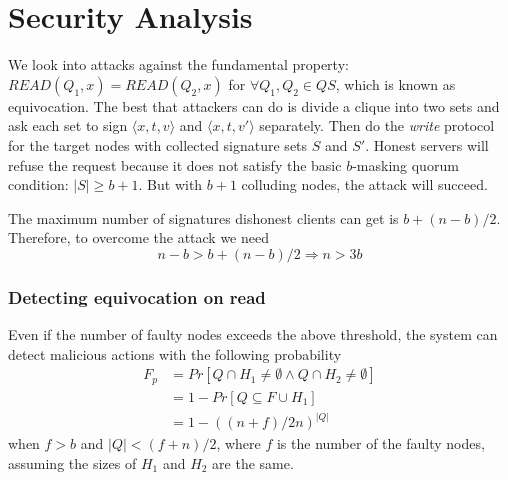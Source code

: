 \section{Security Analysis}
We look into attacks against the fundamental property:
$READ(Q_1,x) = READ(Q_2,x)$ for $\forall Q_1, Q_2 \in QS$, which is
known as equivocation.  The best that attackers can do is divide a
clique into two sets and ask each set to sign $\langle x,t,v \rangle$
and $\langle x,t,v' \rangle$ separately. Then do the {\em write}
protocol for the target nodes with collected signature sets $S$ and
$S'$. Honest servers will refuse the request because it does not
satisfy the basic $b$-masking quorum condition: $|S| \geq b+1$. But
with $b+1$ colluding nodes, the attack will succeed.

\ifdefined\ABSTRACT
\else

\newcommand{\slice}[4]{
  \pgfmathparse{0.5*#1+0.5*#2}
  \let\midangle\pgfmathresult

  \draw[thick,fill=black!10] (0,0) -- (#1:1) arc (#1:#2:1) -- cycle;

  \node[label=\midangle:#4] at (\midangle:1) {};

  \pgfmathparse{min((#2-#1-10)/110*(-0.3),0)}
  \let\temp\pgfmathresult
  \pgfmathparse{max(\temp,-0.5) + 0.8}
  \let\innerpos\pgfmathresult
  \node at (\midangle:\innerpos) {#3};
}


\fi

The maximum number of signatures dishonest clients can get is
$b+(n-b)/2$. Therefore, to overcome the attack we need
\[ n-b > b+(n-b)/2 \Rightarrow n > 3b \]

\subsubsection*{Detecting equivocation on read}
Even if the number of faulty nodes exceeds the above threshold, the
system can detect malicious actions with the following probability
\begin{align*}
  F_p &= Pr[Q \cap H_1 \neq \emptyset \wedge Q \cap H_2 \neq
        \emptyset] \\
      & = 1 - Pr[Q \subseteq F \cup H_1] \\
      & = 1 - ((n + f) / 2n)^{|Q|}
\end{align*}
when $f > b$ and $|Q| < (f + n)/2$, where $f$ is the number of the
faulty nodes, assuming the sizes of $H_1$ and $H_2$ are the same.

